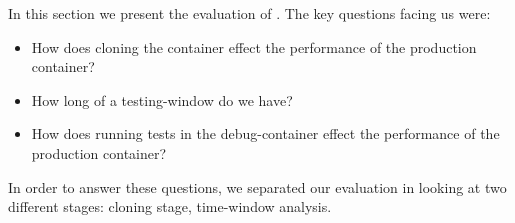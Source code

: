 \iffalse
In this section we present the evaluation of \parikshan. 
The key questions facing us were:
\begin{itemize}
   \item How does cloning the container effect the performance of the production container?
   \item How long of a testing-window do we have? 
   \item How does running tests in the debug-container effect the performance of the production container?
\end{itemize}
In order to answer these questions, we separated our evaluation in looking at two different stages: cloning stage, time-window analysis.

